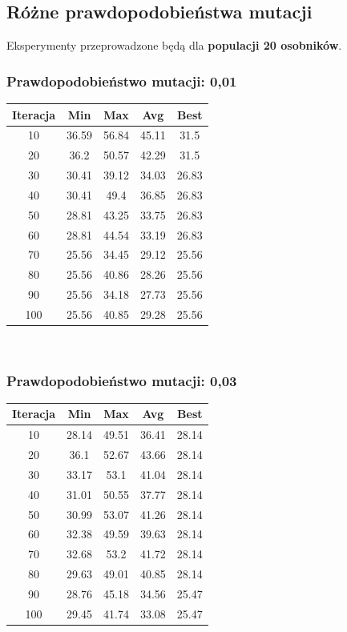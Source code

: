 \documentclass[a4paper,11pt]{article}
\begin{document}
		\subsection{Różne prawdopodobieństwa mutacji}
			Eksperymenty przeprowadzone będą dla \textbf{populacji 20 osobników}.
			\subsubsection{Prawdopodobieństwo mutacji: 0,01}
				\begin{tabular}{|c|c|c|c|c|}
					\hline 
					Iteracja &  Min &  Max & Avg & Best\\
					\hline
					10 & 36.59 & 56.84 & 45.11 & 31.5\\
					\hline
					20 & 36.2 & 50.57 & 42.29 & 31.5\\
					\hline
					30 & 30.41 & 39.12 & 34.03 & 26.83\\
					\hline
					40 & 30.41 & 49.4 & 36.85 & 26.83\\
					\hline
					50 & 28.81 & 43.25 & 33.75 & 26.83\\
					\hline
					60 & 28.81 & 44.54 & 33.19 & 26.83\\
					\hline
					70 & 25.56 & 34.45 & 29.12 & 25.56\\
					\hline
					80 & 25.56 & 40.86 & 28.26 & 25.56\\
					\hline
					90 & 25.56 & 34.18 & 27.73 & 25.56\\
					\hline
					100 & 25.56 & 40.85 & 29.28 & 25.56\\
					\hline
				\end{tabular} \\
			\subsubsection{Prawdopodobieństwo mutacji: 0,03}
				\begin{tabular}{|c|c|c|c|c|}
					\hline 
					Iteracja &  Min &  Max & Avg & Best\\
					\hline
					10 & 28.14 & 49.51 & 36.41 & 28.14\\
					\hline
					20 & 36.1 & 52.67 & 43.66 & 28.14\\
					\hline
					30 & 33.17 & 53.1 & 41.04 & 28.14\\
					\hline
					40 & 31.01 & 50.55 & 37.77 & 28.14\\
					\hline
					50 & 30.99 & 53.07 & 41.26 & 28.14\\
					\hline
					60 & 32.38 & 49.59 & 39.63 & 28.14\\
					\hline
					70 & 32.68 & 53.2 & 41.72 & 28.14\\
					\hline
					80 & 29.63 & 49.01 & 40.85 & 28.14\\
					\hline
					90 & 28.76 & 45.18 & 34.56 & 25.47\\
					\hline
					100 & 29.45 & 41.74 & 33.08 & 25.47\\
					\hline
				\end{tabular} \\
\end{document}
